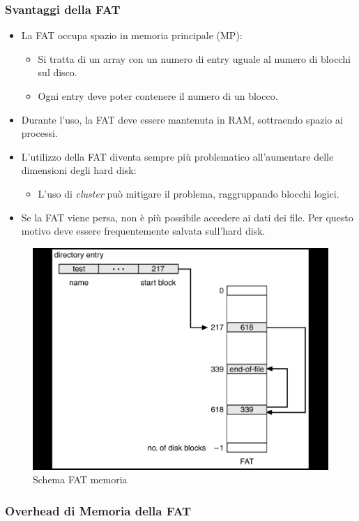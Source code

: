 \subsubsection{Svantaggi della FAT}
\begin{itemize}
    \item La FAT occupa spazio in memoria principale (MP):
          \begin{itemize}
              \item Si tratta di un array con un numero di entry uguale al numero di blocchi sul disco.
              \item Ogni entry deve poter contenere il numero di un blocco.
          \end{itemize}
    \item Durante l’uso, la FAT deve essere mantenuta in RAM, sottraendo spazio ai processi.
    \item L’utilizzo della FAT diventa sempre più problematico all’aumentare delle dimensioni degli hard disk:
          \begin{itemize}
              \item L’uso di \textit{cluster} può mitigare il problema, raggruppando blocchi logici.
          \end{itemize}
    \item Se la FAT viene persa, non è più possibile accedere ai dati dei file. Per questo motivo deve essere frequentemente salvata sull’hard disk.
\end{itemize}

\begin{figure}[h] \centering \includegraphics[width=0.55\linewidth]{images/fat_scheme.png} \caption{Schema FAT memoria} \end{figure}

\subsubsection{Overhead di Memoria della FAT}

